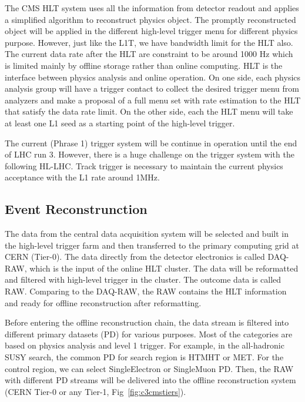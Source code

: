 The CMS HLT system uses all the information from detector readout and applies a simplified algorithm to reconstruct physics object. The promptly reconstructed object will be applied in the different high-level trigger menu for different physics purpose. However, just like the L1T, we have bandwidth limit for the HLT also. The current data rate after the HLT are constraint to be around 1000 Hz which is limited mainly by offline storage rather than online computing. HLT is the interface between physics analysis and online operation. On one side, each physics analysis group will have a trigger contact to collect the desired trigger menu from analyzers and make a proposal of a full menu set with rate estimation to the HLT that satisfy the data rate limit. On the other side, each the HLT menu will take at least one L1 seed as a starting point of the high-level trigger.

The current (Phrase 1) trigger system will be continue in operation until the end of LHC run 3. However, there is a huge challenge on the trigger system with the following HL-LHC. Track trigger is necessary to maintain the current physics acceptance with the L1 rate around 1MHz. 

\clearpage
\subsection{Event Reconstrunction}

The data from the central data acquisition system will be selected and built in the high-level trigger farm and then transferred to the primary computing grid at CERN (Tier-0). The data directly from the detector electronics is called DAQ-RAW, which is the input of the online HLT cluster. The data will be reformatted and filtered with high-level trigger in the cluster. The outcome data is called RAW. Comparing to the DAQ-RAW, the RAW contains the HLT information and ready for offline reconstruction after reformatting. 

Before entering the offline reconstruction chain, the data stream is filtered into different primary datasets (PD) for various purposes. Most of the categories are based on physics analysis and level 1 trigger. For example, in the all-hadronic SUSY search, the common PD for search region is HTMHT or MET. For the control region, we can select SingleElectron or SingleMuon PD. Then, the RAW with different PD streams will be delivered into the offline reconstruction system (CERN Tier-0 or any Tier-1, Fig~\ref{fig:c3cmstiers}). 

